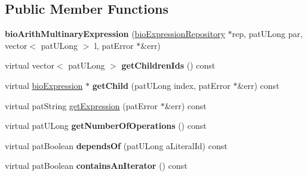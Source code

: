 \subsection*{Public Member Functions}
\begin{DoxyCompactItemize}
\item 
\mbox{\label{classbio_arith_multinary_expression_a2aa44d4013d63760b590225228d41fe7}} 
{\bfseries bio\+Arith\+Multinary\+Expression} (\hyperlink{classbio_expression_repository}{bio\+Expression\+Repository} $\ast$rep, pat\+U\+Long par, vector$<$ pat\+U\+Long $>$ l, pat\+Error $\ast$\&err)
\item 
\mbox{\label{classbio_arith_multinary_expression_a91153f21a2aee1804944a2c9fda23f76}} 
virtual vector$<$ pat\+U\+Long $>$ {\bfseries get\+Children\+Ids} () const
\item 
\mbox{\label{classbio_arith_multinary_expression_a5cc2ce0bb83b7458e49efbe71bc6f617}} 
virtual \hyperlink{classbio_expression}{bio\+Expression} $\ast$ {\bfseries get\+Child} (pat\+U\+Long index, pat\+Error $\ast$\&err) const
\item 
virtual pat\+String \hyperlink{classbio_arith_multinary_expression_a769ab218dc1f1efcdaf3204da0ecc705}{get\+Expression} (pat\+Error $\ast$\&err) const
\item 
\mbox{\label{classbio_arith_multinary_expression_af08df3df6ae0c84459b741649dc604bd}} 
virtual pat\+U\+Long {\bfseries get\+Number\+Of\+Operations} () const
\item 
\mbox{\label{classbio_arith_multinary_expression_a8bcf2022391ab3a356623c63047a52b9}} 
virtual pat\+Boolean {\bfseries depends\+Of} (pat\+U\+Long a\+Literal\+Id) const
\item 
\mbox{\label{classbio_arith_multinary_expression_afb4941e95c5957c5f666a0e84b030721}} 
virtual pat\+Boolean {\bfseries contains\+An\+Iterator} () const
\item 
\mbox{\label{classbio_arith_multinary_expression_ac78de0c49d0e1d78403ef49462ee9e62}} 

\end{DoxyCompactItemize}
